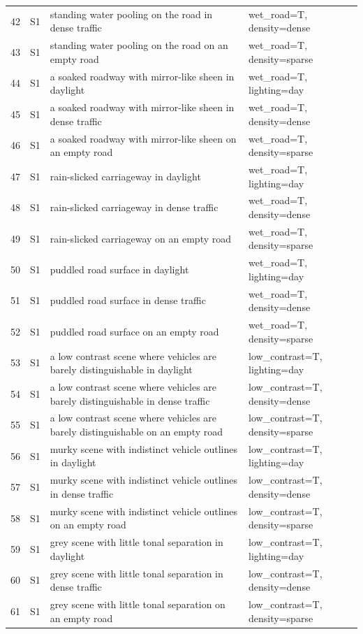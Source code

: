 \begin{longtable}{r l p{8.6cm} p{5.6cm}}
42 & S1 & standing water pooling on the road in dense traffic & wet\_road=T, density=dense\\
43 & S1 & standing water pooling on the road on an empty road & wet\_road=T, density=sparse\\
44 & S1 & a soaked roadway with mirror-like sheen in daylight & wet\_road=T, lighting=day\\
45 & S1 & a soaked roadway with mirror-like sheen in dense traffic & wet\_road=T, density=dense\\
46 & S1 & a soaked roadway with mirror-like sheen on an empty road & wet\_road=T, density=sparse\\
47 & S1 & rain-slicked carriageway in daylight & wet\_road=T, lighting=day\\
48 & S1 & rain-slicked carriageway in dense traffic & wet\_road=T, density=dense\\
49 & S1 & rain-slicked carriageway on an empty road & wet\_road=T, density=sparse\\
50 & S1 & puddled road surface in daylight & wet\_road=T, lighting=day\\
51 & S1 & puddled road surface in dense traffic & wet\_road=T, density=dense\\
52 & S1 & puddled road surface on an empty road & wet\_road=T, density=sparse\\
53 & S1 & a low contrast scene where vehicles are barely distinguishable in daylight & low\_contrast=T, lighting=day\\
54 & S1 & a low contrast scene where vehicles are barely distinguishable in dense traffic & low\_contrast=T, density=dense\\
55 & S1 & a low contrast scene where vehicles are barely distinguishable on an empty road & low\_contrast=T, density=sparse\\
56 & S1 & murky scene with indistinct vehicle outlines in daylight & low\_contrast=T, lighting=day\\
57 & S1 & murky scene with indistinct vehicle outlines in dense traffic & low\_contrast=T, density=dense\\
58 & S1 & murky scene with indistinct vehicle outlines on an empty road & low\_contrast=T, density=sparse\\
59 & S1 & grey scene with little tonal separation in daylight & low\_contrast=T, lighting=day\\
60 & S1 & grey scene with little tonal separation in dense traffic & low\_contrast=T, density=dense\\
61 & S1 & grey scene with little tonal separation on an empty road & low\_contrast=T, density=sparse\\

\end{longtable}
